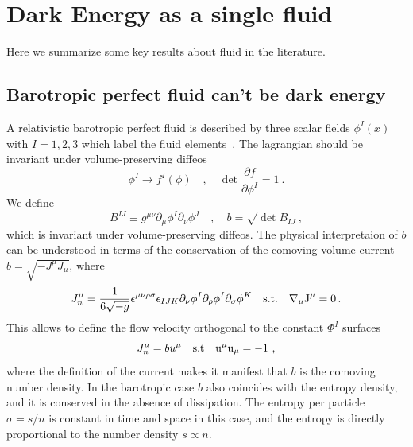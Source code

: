 \section{Dark Energy as a single fluid}
Here we summarize some key results about fluid in the literature.


\subsection{Barotropic perfect fluid can't be dark energy}
A relativistic barotropic perfect fluid is described by three scalar fields $\phi^I(x)$ with $I=1,2,3$ which label the fluid elements~\cite{Dubovsky:2005xd}. The lagrangian should be invariant under volume-preserving diffeos
\begin{equation}
\phi^I\to f^I(\phi)\quad ,\quad \det\frac{\partial f}{\partial \phi^I}=1\ .   
\end{equation}
We define
\begin{equation}
    B^{IJ}\equiv g^{\mu\nu}\partial_\mu\phi^I\partial_\nu\phi^J\quad,\quad b=\sqrt{\det B_{IJ}}\, ,   \label{eq:b}
\end{equation}
which is invariant under volume-preserving diffeos. The physical interpretaion of $b$ can be understood in terms of the conservation of the comoving volume current $b=\sqrt{-J^\mu J_\mu}$, where 
\begin{equation}
    J^\mu_n=\frac{1}{6\sqrt{-g}}\epsilon^{\mu\nu\rho\sigma}\epsilon_{IJK}\partial_\nu\phi^I\partial_\rho\phi^I\partial_\sigma\phi^K\quad \rm{s.t.}\quad  \nabla_\mu J^\mu=0  \,.  
\end{equation}
This allows to define the flow velocity orthogonal to the constant $\Phi^I$ surfaces
\begin{equation}
J^\mu_n=b u^\mu\quad \rm{s.t}\quad u^\mu u_\mu=-1\ ,
\end{equation}
where the definition of the current makes it manifest that $b$ is the comoving number density.
In the barotropic case $b$ also coincides with the entropy density, and it is conserved in the absence of dissipation. The entropy per particle $\sigma=s/n$ is constant in time  and space in this case, and the entropy is directly proportional to the number density $s\propto n$.

